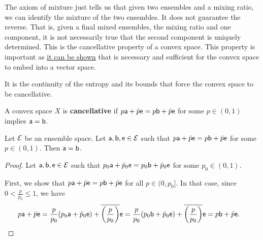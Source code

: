 The axiom of mixture just tells us that given two ensembles and a mixing ratio, we can identify the mixture of the two ensembles. It does not guarantee the reverse. That is, given a final mixed ensembles, the mixing ratio and one component, it is not necessarily true that the second component is uniquely determined. This is the cancellative property of a convex space. This property is important as \href{https://arxiv.org/abs/1105.1270}{it can be shown} that is necessary and sufficient for the convex space to embed into a vector space.

It is the continuity of the entropy and its bounds that force the convex space to be cancellative.

\begin{mathSection}
\begin{defn}
	A convex space $X$ is \textbf{cancellative} if $p \ens[a] + \bar{p} \ens = p \ens[b] + \bar{p} \ens$ for some $p \in (0,1)$ implies $\ens[a] = \ens[b]$.
\end{defn}

\begin{thrm}
	Let $\Ens$ be an ensemble space. Let $\ens[a], \ens[b], \ens \in \Ens$ such that $p\ens[a] + \bar{p} \ens = p \ens[b] + \bar{p} \ens$ for some $p \in (0,1)$. Then $\ens[a] = \ens[b]$.
\end{thrm}

\begin{proof}
	Let $\ens[a], \ens[b], \ens \in \Ens$ such that $p_0\ens[a] + \bar{p}_0 \ens = p_0 \ens[b] + \bar{p}_0 \ens$ for some $p_0 \in (0,1)$.
	
	First, we show that $p\ens[a] + \bar{p} \ens = p \ens[b] + \bar{p} \ens$ for all $p \in (0,p_0]$. In that case, since $0 < \frac{p}{p_0} \leq 1$, we have
	\begin{equation}
		\begin{aligned}
			p \ens[a] + \bar{p} \ens &= \frac{p}{p_0} (p_0 \ens[a] + \bar{p}_0 \ens) + \overline{\left(\frac{p}{p_0}\right)} \ens = \frac{p}{p_0} (p_0 \ens[b] + \bar{p}_0 \ens) + \overline{\left(\frac{p}{p_0}\right)} \ens = p \ens[b] + \bar{p} \ens.
		\end{aligned}
	\end{equation}
	

\end{proof}
\end{mathSection}
